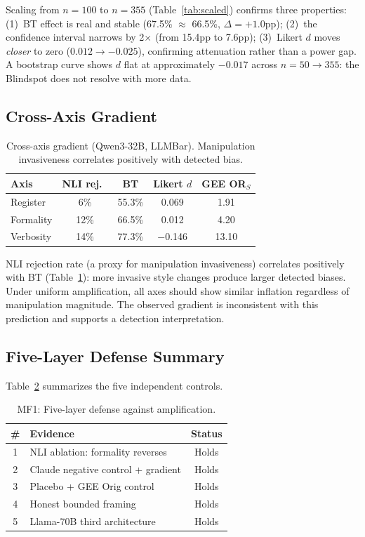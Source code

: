 \documentclass[11pt,twocolumn]{article}
\begin{document}
Scaling from $n = 100$ to $n = 355$ (Table~\ref{tab:scaled}) confirms three properties: (1)~BT effect is real and stable (67.5\% $\approx$ 66.5\%, $\Delta = +1.0$pp); (2)~the confidence interval narrows by 2$\times$ (from 15.4pp to 7.6pp); (3)~Likert $d$ moves \emph{closer} to zero ($0.012 \to -0.025$), confirming attenuation rather than a power gap. A bootstrap curve shows $d$ flat at approximately $-0.017$ across $n = 50 \to 355$: the Blindspot does not resolve with more data.

\subsection{Cross-Axis Gradient}
\label{sec:gradient}

\begin{table}[t]
\centering
\small
\caption{Cross-axis gradient (Qwen3-32B, LLMBar). Manipulation invasiveness correlates positively with detected bias.}
\label{tab:gradient}
\begin{tabular}{@{}lcccc@{}}
\toprule
Axis & NLI rej.\ & BT & Likert $d$ & GEE OR$_S$ \\
\midrule
Register & 6\% & 55.3\% & 0.069 & 1.91 \\
Formality & 12\% & 66.5\% & 0.012 & 4.20 \\
Verbosity & 14\% & 77.3\% & $-$0.146 & 13.10 \\
\bottomrule
\end{tabular}
\vspace{-2mm}
\end{table}

NLI rejection rate (a proxy for manipulation invasiveness) correlates positively with BT (Table~\ref{tab:gradient}): more invasive style changes produce larger detected biases. Under uniform amplification, all axes should show similar inflation regardless of manipulation magnitude. The observed gradient is inconsistent with this prediction and supports a detection interpretation.

\subsection{Five-Layer Defense Summary}
\label{sec:mf1}

Table~\ref{tab:mf1} summarizes the five independent controls.

\begin{table}[t]
\centering
\small
\caption{MF1: Five-layer defense against amplification.}
\label{tab:mf1}
\begin{tabular}{@{}clc@{}}
\toprule
\# & Evidence & Status \\
\midrule
1 & NLI ablation: formality reverses & Holds \\
2 & Claude negative control + gradient & Holds \\
3 & Placebo + GEE Orig control & Holds \\
4 & Honest bounded framing & Holds \\
5 & Llama-70B third architecture & Holds \\
\bottomrule
\end{tabular}
\vspace{-2mm}
\end{table}
\end{document}
